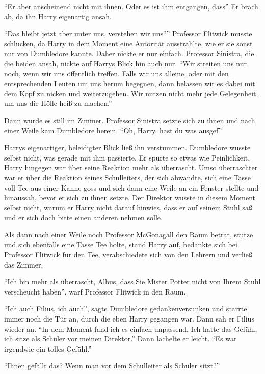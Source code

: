 \enquote{Er aber anscheinend nicht mit ihnen. Oder es ist ihm entgangen, dass\abs} Er brach ab, da ihn Harry eigenartig ansah.

\enquote{Das bleibt jetzt aber unter uns, verstehen wir uns?} Professor Flitwick musste schlucken, da Harry in dem Moment eine Autorität ausstrahlte, wie er sie sonst nur von Dumbledore kannte. Daher nickte er nur einfach. Professor Sinistra, die die beiden ansah, nickte auf Harrys Blick hin auch nur. \enquote{Wir streiten uns nur noch, wenn wir uns öffentlich treffen. Falls wir uns alleine, oder mit den entsprechenden Leuten um uns herum begegnen, dann belassen wir es dabei mit dem Kopf zu nicken und weiterzugehen. Wir nutzen nicht mehr jede Gelegenheit, um uns die Hölle heiß zu machen.}

Dann wurde es still im Zimmer. Professor Sinistra setzte sich zu ihnen und nach einer Weile kam Dumbledore herein. \enquote{Oh, Harry, hast du was ausgef\aabs}

Harrys eigenartiger, beleidigter Blick ließ ihn verstummen. Dumbledore wusste selbst nicht, was gerade mit ihm passierte. Er spürte so etwas wie Peinlichkeit. Harry hingegen war über seine Reaktion mehr als überrascht. Umso überraschter war er über die Reaktion seines Schulleiters, der sich abwandte, sich eine Tasse voll Tee aus einer Kanne goss und sich dann eine Weile an ein Fenster stellte und hinaussah, bevor er sich zu ihnen setzte. Der Direktor wusste in diesem Moment selbst nicht, warum er Harry nicht darauf hinwies, dass er auf seinem Stuhl saß und er sich doch bitte einen anderen nehmen solle.

Als dann nach einer Weile noch Professor McGonagall den Raum betrat, stutze und sich ebenfalls eine Tasse Tee holte, stand Harry auf, bedankte sich bei Professor Flitwick für den Tee, verabschiedete sich von den Lehrern und verließ das Zimmer.

\enquote{Ich bin mehr als überrascht, Albus, dass Sie Mister Potter nicht von Ihrem Stuhl verscheucht haben}, warf Professor Flitwick in den Raum.

\enquote{Ich auch Filius, ich auch}, sagte Dumbledore gedankenversunken und starrte immer noch die Tür an, durch die eben Harry gegangen war. Dann sah er Filius wieder an. \enquote{In dem Moment fand ich es einfach unpassend. Ich hatte das Gefühl, ich sitze als Schüler vor meinen Direktor.} Dann lächelte er leicht. \enquote{Es war irgendwie ein tolles Gefühl.}

\enquote{Ihnen gefällt das? Wenn man vor dem Schulleiter als Schüler sitzt?}

